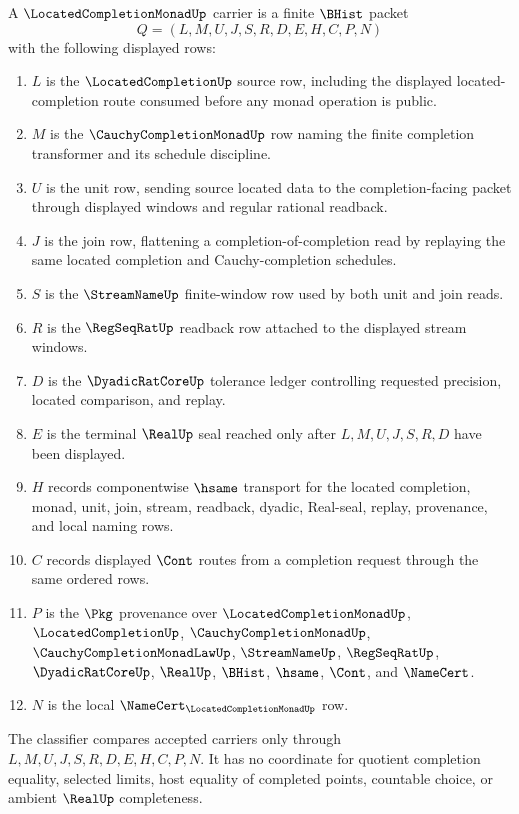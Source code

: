 \begin{definition}
\label{def:located-completion-monad-carrier}
A $\LocatedCompletionMonadUp$ carrier is a finite $\BHist$ packet
$$
Q=(L,M,U,J,S,R,D,E,H,C,P,N)
$$
with the following displayed rows:
\begin{enumerate}
\item $L$ is the $\LocatedCompletionUp$ source row, including the displayed located-completion route consumed before any monad operation is public.
\item $M$ is the $\CauchyCompletionMonadUp$ row naming the finite completion transformer and its schedule discipline.
\item $U$ is the unit row, sending source located data to the completion-facing packet through displayed windows and regular rational readback.
\item $J$ is the join row, flattening a completion-of-completion read by replaying the same located completion and Cauchy-completion schedules.
\item $S$ is the $\StreamNameUp$ finite-window row used by both unit and join reads.
\item $R$ is the $\RegSeqRatUp$ readback row attached to the displayed stream windows.
\item $D$ is the $\DyadicRatCoreUp$ tolerance ledger controlling requested precision, located comparison, and replay.
\item $E$ is the terminal $\RealUp$ seal reached only after $L,M,U,J,S,R,D$ have been displayed.
\item $H$ records componentwise $\hsame$ transport for the located completion, monad, unit, join, stream, readback, dyadic, Real-seal, replay, provenance, and local naming rows.
\item $C$ records displayed $\Cont$ routes from a completion request through the same ordered rows.
\item $P$ is the $\Pkg$ provenance over $\LocatedCompletionMonadUp$, $\LocatedCompletionUp$, $\CauchyCompletionMonadUp$, $\CauchyCompletionMonadLawUp$, $\StreamNameUp$, $\RegSeqRatUp$, $\DyadicRatCoreUp$, $\RealUp$, $\BHist$, $\hsame$, $\Cont$, and $\NameCert$.
\item $N$ is the local $\NameCert_{\LocatedCompletionMonadUp}$ row.
\end{enumerate}
The classifier compares accepted carriers only through $L,M,U,J,S,R,D,E,H,C,P,N$. It has no coordinate for quotient completion equality, selected limits, host equality of completed points, countable choice, or ambient $\RealUp$ completeness.
\end{definition}


